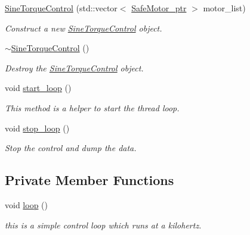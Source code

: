 \begin{DoxyCompactItemize}
\item 
\hyperlink{classblmc__drivers_1_1SineTorqueControl_ab3fcdb73429a6e4a664dc294f80e6d3c}{Sine\+Torque\+Control} (std\+::vector$<$ \hyperlink{namespaceblmc__drivers_ab975c3be3c53a93a10c491f07a132e2b}{Safe\+Motor\+\_\+ptr} $>$ motor\+\_\+list)
\begin{DoxyCompactList}\small\item\em Construct a new \hyperlink{classblmc__drivers_1_1SineTorqueControl}{Sine\+Torque\+Control} object. \end{DoxyCompactList}\item 
\hyperlink{classblmc__drivers_1_1SineTorqueControl_ae66565e4a8be3eb93d84f6dc0c825ce6}{$\sim$\+Sine\+Torque\+Control} ()\hypertarget{classblmc__drivers_1_1SineTorqueControl_ae66565e4a8be3eb93d84f6dc0c825ce6}{}\label{classblmc__drivers_1_1SineTorqueControl_ae66565e4a8be3eb93d84f6dc0c825ce6}

\begin{DoxyCompactList}\small\item\em Destroy the \hyperlink{classblmc__drivers_1_1SineTorqueControl}{Sine\+Torque\+Control} object. \end{DoxyCompactList}\item 
void \hyperlink{classblmc__drivers_1_1SineTorqueControl_aa884278b4fc524c8e6d93b23630aa967}{start\+\_\+loop} ()\hypertarget{classblmc__drivers_1_1SineTorqueControl_aa884278b4fc524c8e6d93b23630aa967}{}\label{classblmc__drivers_1_1SineTorqueControl_aa884278b4fc524c8e6d93b23630aa967}

\begin{DoxyCompactList}\small\item\em This method is a helper to start the thread loop. \end{DoxyCompactList}\item 
void \hyperlink{classblmc__drivers_1_1SineTorqueControl_a1ecff8c52b3a8b0f6ece6818c42ec94a}{stop\+\_\+loop} ()\hypertarget{classblmc__drivers_1_1SineTorqueControl_a1ecff8c52b3a8b0f6ece6818c42ec94a}{}\label{classblmc__drivers_1_1SineTorqueControl_a1ecff8c52b3a8b0f6ece6818c42ec94a}

\begin{DoxyCompactList}\small\item\em Stop the control and dump the data. \end{DoxyCompactList}\end{DoxyCompactItemize}
\subsection*{Private Member Functions}
\begin{DoxyCompactItemize}
\item 
void \hyperlink{classblmc__drivers_1_1SineTorqueControl_a9f5f27389db0a303e2bae2f9c5135417}{loop} ()
\begin{DoxyCompactList}\small\item\em this is a simple control loop which runs at a kilohertz. \end{DoxyCompactList}\end{DoxyCompactItemize}
